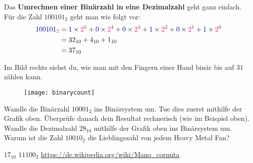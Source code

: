 Das \textbf{Umrechnen einer Binärzahl in eine Dezimalzahl} geht ganz einfach. Für die Zahl $100101_2$ geht man wie folgt vor:
\begin{align}\begin{split}
	\label{equ binaerzahl in basis und nennwerten}
	\textcolor{blue}{100101}_{\textcolor{magenta}{2}}
	&= \textcolor{blue}{1} \times \textcolor{magenta}{2}^{\textcolor{red}{5}}
	 + \textcolor{blue}{0} \times \textcolor{magenta}{2}^{\textcolor{red}{4}}
	 + \textcolor{blue}{0} \times \textcolor{magenta}{2}^{\textcolor{red}{3}}
	 + \textcolor{blue}{1} \times \textcolor{magenta}{2}^{\textcolor{red}{2}}
	 + \textcolor{blue}{0} \times \textcolor{magenta}{2}^{\textcolor{red}{1}}
	 + \textcolor{blue}{1} \times \textcolor{magenta}{2}^{\textcolor{red}{0}}
	\\
	&= 32_{10} + 4_{10} + 1_{10}
	\\
	&= 37_{10}		
\end{split}\end{align}

\begin{minipage}[t]{\textwidth}
\begin{minipage}[t]{0.48\textwidth}
	Im Bild rechts siehst du, wie man mit den Fingern einer Hand binär bis auf $31$ zählen kann.
\end{minipage}
\hfill
\begin{minipage}[t]{0.48\textwidth}
	\begin{figure}[H]
		\vspace{-0.7cm}
		\centering
		\texttt{[image: binarycount]}
	\end{figure}
\end{minipage}
\end{minipage}

\begin{question}
	\begin{tasks}
		\task Wandle die Binärzahl $10001_2$ ins Binärsystem um. Tue dies zuerst mithilfe der Grafik oben. Überprüfe danach dein Resultat rechnerisch (wie im Beispiel oben). 
		\task Wandle die Dezimalzahl $28_{10}$ mithilfe der Grafik oben ins Binärsystem um. 
		\task Warum ist die Zahl $10010_2$ die Lieblingszahl von jedem Heavy Metal Fan? 
	\end{tasks}
\end{question}
\begin{solution}
	\begin{tasks}
		\task $17_{10}$
		\task $11100_2$
		\task \url{https://de.wikipedia.org/wiki/Mano_cornuta}
	\end{tasks}
\end{solution}

